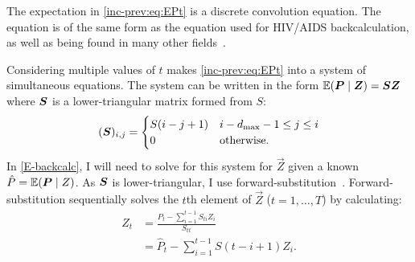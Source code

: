 \documentclass[thesis.tex]{subfiles}
\begin{document}

The expectation in \cref{inc-prev:eq:EPt} is a discrete convolution equation.
The equation is of the same form as the equation used for HIV/AIDS backcalculation, as well as being found in many other fields~\autocite[and references therein]{brookmeyerBackcalculation}.

Considering multiple values of $t$ makes \cref{inc-prev:eq:EPt} into a system of simultaneous equations.
The system can be written in the form $\operatorname{\mathbb{E}}(\bm{P} \mid \bm{Z}) = \bm{S} \bm{Z}$ where $\bm{S}$ is a lower-triangular matrix formed from $S$:
\begin{align}
    (\bm{S})_{i,j} = \begin{cases}
        S(i - j + 1) & i - d_\text{max} - 1 \leq j \leq i \\
        0 & \text{otherwise.}
    \end{cases}
\end{align}
In \cref{E-backcalc}, I will need to solve for this system for $\vec{Z}$ given a known $\hat{P} = \operatorname{\mathbb{E}}(\bm{P} \mid {Z})$.
As $\bm{S}$ is lower-triangular, I use forward-substitution~\autocite{cormenMatrix}.
Forward-substitution sequentially solves the $t$th element of $\vec{Z}$ ($t = 1, \dots, T$) by calculating:
\begin{align}
Z_t
&= \frac{\hat{P}_t - \sum_{i=1}^{t-1} S_{ti} Z_i}{S_{tt}} \\
&= \hat{P}_t - \sum_{i=1}^{t-1} S(t - i + 1) Z_i.
\label{inc-prev:eq:forward-substitute}
\end{align}
\end{document}

